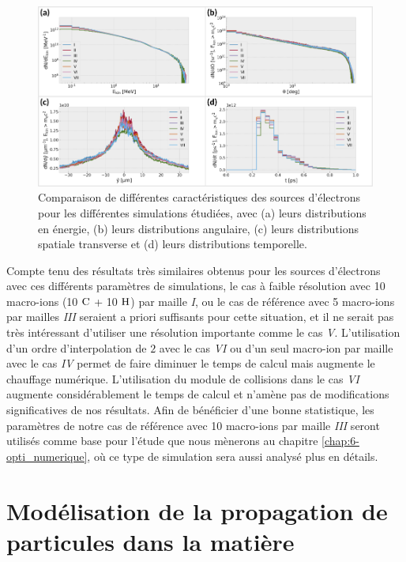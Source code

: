 \begin{refsection}
\begin{figure}[hbtp]
	\centering
	\includegraphics[width=\linewidth]{4-simulation/Smilei_validation.png}
	\caption{Comparaison de différentes caractéristiques des sources d'électrons pour les différentes simulations étudiées, avec (a) leurs distributions en énergie, (b) leurs distributions angulaire, (c) leurs distributions spatiale transverse et (d) leurs distributions temporelle.}
	\label{fig:4-PIC_validation_electrons}
\end{figure}

Compte tenu des résultats très similaires obtenus pour les sources d'électrons avec ces différents paramètres de simulations, le cas à faible résolution avec 10 macro-ions (10 $\rm C$ + 10 $\rm H$) par maille \textit{I}, ou le cas de référence avec 5 macro-ions par mailles \textit{III} seraient a priori suffisants pour cette situation, et il ne serait pas très intéressant d'utiliser une résolution importante comme le cas \textit{V}. L'utilisation d'un ordre d'interpolation de $2$ avec le cas \textit{VI} ou d'un seul macro-ion par maille avec le cas \textit{IV} permet de faire diminuer le temps de calcul mais augmente le chauffage numérique. L'utilisation du module de collisions dans le cas \textit{VI} augmente considérablement le temps de calcul et n'amène pas de modifications significatives de nos résultats.
Afin de bénéficier d'une bonne statistique, les paramètres de notre cas de référence avec 10 macro-ions par maille \textit{III} seront utilisés comme base pour l'étude que nous mènerons au chapitre \ref{chap:6-opti_numerique}, où ce type de simulation sera aussi analysé plus en détails.

\section{Modélisation de la propagation de particules dans la matière}


\end{refsection}
